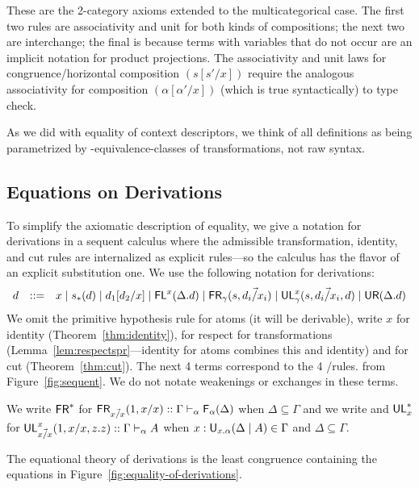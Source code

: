 \noindent These are the 2-category axioms extended to the
multicategorical case.  The first two rules are associativity and unit
for both kinds of compositions; the next two are interchange; the final
is because terms with variables that do not occur are an implicit
notation for product projections.  The associativity and unit laws for
congruence/horizontal composition $(s[s'/x])$ require the analogous
associativity for composition $(\alpha[\alpha'/x])$ (which is true
syntactically) to type check.

As we did with equality of context descriptors, we think of all
definitions as being parametrized by \deq-equivalence-classes of
transformations, not raw syntax.

\subsection{Equations on Derivations}

To simplify the axiomatic description of equality, we give a notation
for derivations in a sequent calculus where the admissible
transformation, identity, and cut rules are internalized as explicit
rules---so the calculus has the flavor of an explicit substitution one.
We use the following notation for derivations:
\[
\begin{array}{rcl}
d & ::= & {x} \mid s_*(d) \mid d_1[d_2/x] \mid
 \mathsf{FL}^{x}(\Delta.d) \mid \mathsf{FR}_{\gamma}(s,\vec{d_i/x_i}) \mid \mathsf{UL}^{x}_{\gamma}(s,\vec{d_i/x_i},d) \mid \mathsf{UR}(\Delta.d) 
\end{array}
\]
We omit the primitive hypothesis rule for atoms (it will be derivable),
write $x$ for identity (Theorem~\ref{thm:identity}),  for
respect for transformations (Lemma~\ref{lem:respectspr}---identity for
atoms combines this and identity) and  for cut
(Theorem~\ref{thm:cut}).  The next 4 terms correspond to the 4
\Usymb/\Fsymb rules.  from Figure~\ref{fig:sequent}.  
We do not notate weakenings or exchanges in these terms.

\newcommand\FRs{\ensuremath{\FR^*}}
\newcommand\ULs[1]{\ensuremath{\UL^*_{#1}}}

We write \FRs\/ for $\mathsf{FR}_{\vec{x/x}}(1,{x}/x) ::
\Gamma \vdash_{\alpha} \mathsf{F}_{\alpha}(\Delta)$ when $\Delta \subseteq \Gamma$
and we write and \ULs{x} for $\mathsf{UL}^{x}_{\vec{x/x}}(1,{x}/x,z.z) ::
\Gamma \vdash_{\alpha} A$ when $x:\mathsf{U}_{x.\alpha}(\Delta \mid A) \in \Gamma$ and
$\Delta \subseteq \Gamma$.  

The equational theory of derivations is the least congruence containing
the equations in Figure~\ref{fig:equality-of-derivations}.

